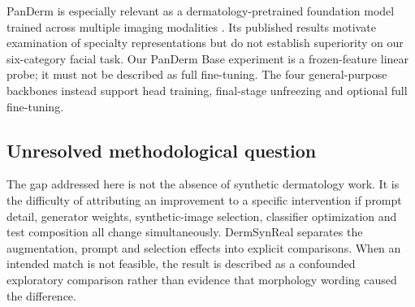 PanDerm is especially relevant as a dermatology-pretrained foundation model trained across multiple imaging modalities \citep{yan2025panderm}. Its published results motivate examination of specialty representations but do not establish superiority on our six-category facial task. Our PanDerm Base experiment is a frozen-feature linear probe; it must not be described as full fine-tuning. The four general-purpose backbones instead support head training, final-stage unfreezing and optional full fine-tuning.

\subsection{Unresolved methodological question}
The gap addressed here is not the absence of synthetic dermatology work. It is the difficulty of attributing an improvement to a specific intervention if prompt detail, generator weights, synthetic-image selection, classifier optimization and test composition all change simultaneously. DermSynReal separates the augmentation, prompt and selection effects into explicit comparisons. When an intended match is not feasible, the result is described as a confounded exploratory comparison rather than evidence that morphology wording caused the difference.
